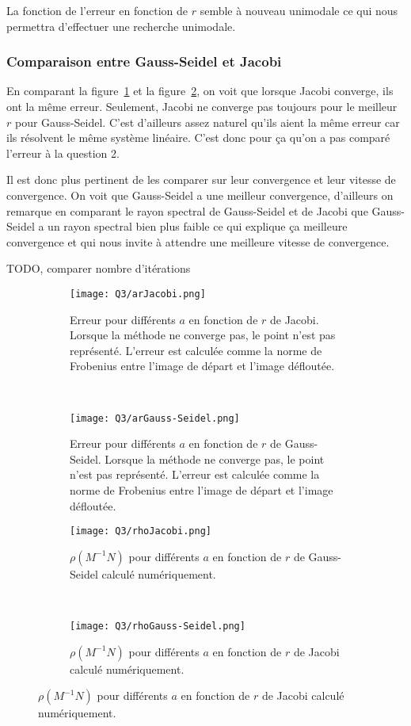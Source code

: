 La fonction de l'erreur en fonction de $r$ semble à nouveau unimodale
ce qui nous permettra d'effectuer une recherche unimodale.

\subsubsection{Comparaison entre Gauss-Seidel et Jacobi}
En comparant la figure~\ref{fig:arj} et la figure~\ref{fig:args}, on voit
que lorsque Jacobi converge, ils ont la même erreur.
Seulement, Jacobi ne converge pas toujours pour le meilleur $r$ pour Gauss-Seidel.
C'est d'ailleurs assez naturel qu'ils aient la même erreur car ils résolvent le même
système linéaire.
C'est donc pour ça qu'on a pas comparé l'erreur à la question 2.

Il est donc plus pertinent de les comparer sur leur convergence et leur vitesse
de convergence.
On voit que Gauss-Seidel a une meilleur convergence,
d'ailleurs on remarque en comparant le rayon spectral de Gauss-Seidel et de Jacobi
que Gauss-Seidel a un rayon spectral bien plus faible ce qui explique ça meilleure
convergence et qui nous invite à attendre une meilleure vitesse de convergence.

TODO, comparer nombre d'itérations

\begin{figure}
  \centering
  \begin{subfigure}[b]{0.45\textwidth}
    \texttt{[image: Q3/arJacobi.png]}
    \caption{Erreur pour différents $a$ en fonction de $r$ de Jacobi.
      Lorsque la méthode ne converge pas, le point n'est pas représenté.
      L'erreur est calculée comme la norme de Frobenius entre l'image de départ
    et l'image défloutée.}
    \label{fig:arj}
  \end{subfigure}%
  ~
  \begin{subfigure}[b]{0.45\textwidth}
    \texttt{[image: Q3/arGauss-Seidel.png]}
    \caption{Erreur pour différents $a$ en fonction de $r$ de Gauss-Seidel.
      Lorsque la méthode ne converge pas, le point n'est pas représenté.
      L'erreur est calculée comme la norme de Frobenius entre l'image de départ
    et l'image défloutée.}
    \label{fig:args}
  \end{subfigure}

  \begin{subfigure}[b]{0.45\textwidth}
    \texttt{[image: Q3/rhoJacobi.png]}
    \caption{$\rho(M^{-1}N)$ pour différents $a$ en fonction de $r$ de Gauss-Seidel
    calculé numériquement.}
    \label{fig:rhoj}
  \end{subfigure}%
  ~
  \begin{subfigure}[b]{0.45\textwidth}
    \texttt{[image: Q3/rhoGauss-Seidel.png]}
    \caption{$\rho(M^{-1}N)$ pour différents $a$ en fonction de $r$ de Jacobi
    calculé numériquement.}
    \label{fig:rhogs}
  \end{subfigure}
\end{figure}

